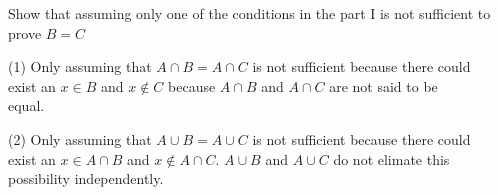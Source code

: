 \documentclass{article}
\begin{document}
\begin{flushleft}
Show that assuming only one of the conditions in the part I is not sufficient to prove $B = C$ \\
\end{flushleft}

\begin{flushleft}
 (1)\:\: Only assuming that $A \cap B = A \cap C$ is not sufficient because there could \\
 \qquad exist an $x \in B$ and  $x \not \in C$ because $A \cap B$ and $A \cap C$ are not said to be \\ \qquad equal.
\end{flushleft}

\vspace{2cm}

\begin{flushleft}
 (2)\:\: Only assuming that $A \cup B = A \cup C$ is not sufficient because there could \\ 
 \qquad exist an $x \in A \cap B$ and  $x \not \in A \cap C$. $A \cup B$ and $A \cup C$ do not elimate this \\ 
 \qquad possibility independently.
\end{flushleft}
\end{document}

